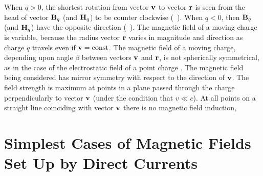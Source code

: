 When $q > 0$, the shortest rotation from vector $\vb{v}$ to vector $\vb{r}$ is seen from the head of vector $\vb{B}_{q}$ (and $\vb{H}_{q}$) to be counter­
 clockwise (~). When $q < 0$, then $\vb{B}_{q}$ (and $\vb{H}_{q}$) have the opposite direction (~). The magnetic field of a moving charge is variable, because the radius vector $\vb{r}$ varies in magnitude and direction as charge $q$ travels even if $\vb{v} = \text{const}$. The magnetic field of a moving charge, depending upon angle $\beta$ between vectors $\vb{v}$ and $\vb{r}$, is not spherically symmetrical, as in the case of the electrostatic field of a point charge . The magnetic field being considered has mirror symmetry with respect to the direction of $\vb{v}$. The field strength is maximum at points in a plane passed through the charge perpendicularly to vector $\vb{v}$ (under the condition that $v \ll c$). At all points on a straight line coinciding with vector $\vb{v}$ there is no magnetic field induction,

\section[Simplest Cases of Magnetic Fields]{Simplest Cases of Magnetic Fields Set Up by Direct Currents}
\label{sec-23.3}


